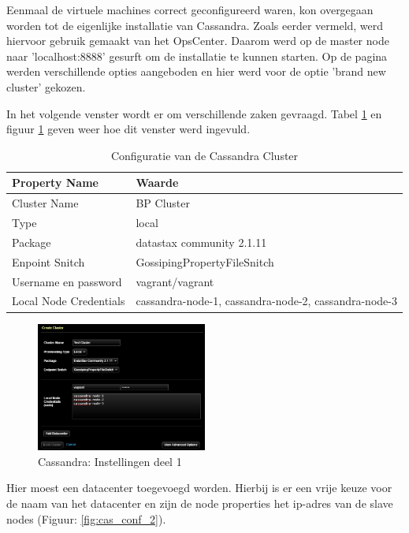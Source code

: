 Eenmaal de virtuele machines correct geconfigureerd waren, kon overgegaan worden tot de eigenlijke installatie van Cassandra.
Zoals eerder vermeld, werd hiervoor gebruik gemaakt van het OpsCenter.
Daarom werd op de master node naar 'localhost:8888' gesurft om de installatie te kunnen  starten.
Op de pagina werden verschillende opties aangeboden en hier werd voor de optie 'brand new cluster' gekozen.

In het volgende venster wordt er om verschillende zaken gevraagd.
Tabel \ref{tab:cas_conf} en figuur \ref{fig:cas_conf_1} geven weer hoe dit venster werd ingevuld.

\begin{table}[H]
  \begin{tabular}{|l|l|}
  \hline
  Property Name & Waarde \\
  \hline
  \hline
  Cluster Name & BP Cluster \\
  \hline
  Type & local \\
  \hline
  Package & datastax community 2.1.11 \\
  \hline
  Enpoint Snitch & GossipingPropertyFileSnitch \\
  \hline
  Username en password & vagrant/vagrant\\
  \hline
  Local Node Credentials & cassandra-node-1, cassandra-node-2, cassandra-node-3 \\
  \hline
  \end{tabular}
  \caption{Configuratie van de Cassandra Cluster}
  \label{tab:cas_conf}
\end{table}

\begin{figure}[H]
  	\centering
    \includegraphics[width=0.5\textwidth]{img/4_installatie_cassandra/1_Configuration_part_1}
    \caption{Cassandra: Instellingen deel 1}
    \label{fig:cas_conf_1}
\end{figure}

Hier moest een datacenter toegevoegd worden.
Hierbij is er een vrije keuze voor de naam van het datacenter en zijn de node properties het ip-adres van de slave nodes (Figuur: \ref{fig:cas_conf_2}).

